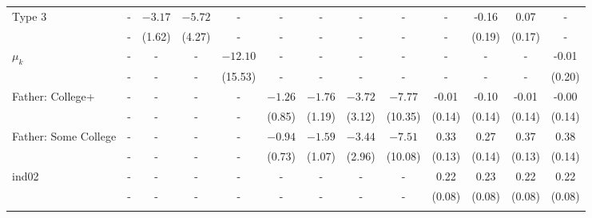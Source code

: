 \begin{tabular}{lcccccccccccc}
Type 3&-&$-3.17$&$-5.72$&-&-&-&-&-&-&-0.16&0.07&-\\
&-&(1.62)&(4.27)&-&-&-&-&-&-&(0.19)&(0.17)&-\\
$\mu_{k}$&-&-&-&$-12.10$&-&-&-&-&-&-&-&-0.01\\
&-&-&-&(15.53)&-&-&-&-&-&-&-&(0.20)\\
Father: College+&-&-&-&-&$-1.26$&$-1.76$&$-3.72$&$-7.77$&-0.01&-0.10&-0.01&-0.00\\
&-&-&-&-&(0.85)&(1.19)&(3.12)&(10.35)&(0.14)&(0.14)&(0.14)&(0.14)\\
Father: Some College&-&-&-&-&$-0.94$&$-1.59$&$-3.44$&$-7.51$&0.33&0.27&0.37&0.38\\
&-&-&-&-&(0.73)&(1.07)&(2.96)&(10.08)&(0.13)&(0.14)&(0.13)&(0.14)\\
ind02&-&-&-&-&-&-&-&-&0.22&0.23&0.22&0.22\\
&-&-&-&-&-&-&-&-&(0.08)&(0.08)&(0.08)&(0.08)\\
\\
\bottomrule\end{tabular}